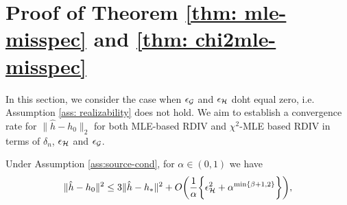 \section{Proof of Theorem \ref{thm: mle-misspec} and \ref{thm: chi2mle-misspec}}\label{sec: proof-misspec}
In this section, we consider the case when $\epsilon_{\mathcal{G}}$ and $\epsilon_{\mathcal{H}}$ doht equal zero, i.e. Assumption \ref{ass: realizability} does not hold. We aim to establish a convergence rate for $\|\hat{h} - h_0\|_2$ for both MLE-based RDIV and $\chi^2$-MLE based RDIV in terms of $\delta_n$, $\epsilon_{\mathcal{H}}$ and $\epsilon_{\mathcal{G}}$. 
\begin{lemma}\label{lem:misspec-main}
Under Assumption \ref{ass:source-cond}, for $\alpha \in (0,1)$ we have 
    \begin{align*}
    \|\hat{h} - h_0\|^2 \leq 3\|\hat{h} - h_{*}\|^2+O\bigg(\frac{1}{\alpha}\bigg\{\epsilon_{\mathcal{H}}^2 + \alpha^{\min\{\beta+1,2\}}\bigg\}\bigg),
\end{align*}
\end{lemma}
